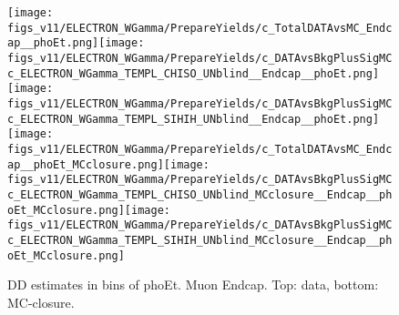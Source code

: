 \begin{figure}[htb]
  \begin{center}
   \texttt{[image: figs\_v11/ELECTRON\_WGamma/PrepareYields/c\_TotalDATAvsMC\_Endcap\_\_phoEt.png]}\texttt{[image: figs\_v11/ELECTRON\_WGamma/PrepareYields/c\_DATAvsBkgPlusSigMCc\_ELECTRON\_WGamma\_TEMPL\_CHISO\_UNblind\_\_Endcap\_\_phoEt.png]}\texttt{[image: figs\_v11/ELECTRON\_WGamma/PrepareYields/c\_DATAvsBkgPlusSigMCc\_ELECTRON\_WGamma\_TEMPL\_SIHIH\_UNblind\_\_Endcap\_\_phoEt.png]}
   \texttt{[image: figs\_v11/ELECTRON\_WGamma/PrepareYields/c\_TotalDATAvsMC\_Endcap\_\_phoEt\_MCclosure.png]}\texttt{[image: figs\_v11/ELECTRON\_WGamma/PrepareYields/c\_DATAvsBkgPlusSigMCc\_ELECTRON\_WGamma\_TEMPL\_CHISO\_UNblind\_MCclosure\_\_Endcap\_\_phoEt\_MCclosure.png]}\texttt{[image: figs\_v11/ELECTRON\_WGamma/PrepareYields/c\_DATAvsBkgPlusSigMCc\_ELECTRON\_WGamma\_TEMPL\_SIHIH\_UNblind\_MCclosure\_\_Endcap\_\_phoEt\_MCclosure.png]}
  \caption{DD estimates in bins of phoEt. Muon Endcap. Top: data, bottom: MC-closure.}
  \end{center}
\end{figure}
